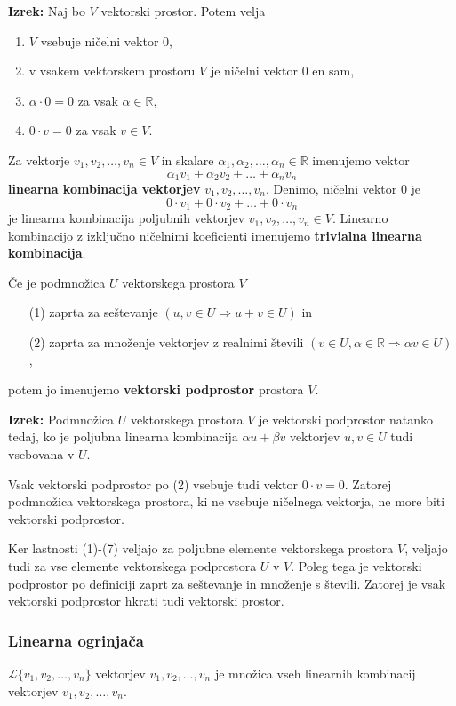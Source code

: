 \documentclass{article}
\begin{document}
\begin{multicols}{2}
	\textbf{Izrek:} Naj bo \( V \) vektorski prostor. Potem velja
	\begin{enumerate}
		\item \( V \) vsebuje ničelni vektor \( 0 \),
		\item v vsakem vektorskem prostoru \( V \) je ničelni vektor \( 0 \) en sam,
		\item \( \alpha \cdot 0 = 0 \) za vsak \( \alpha \in \mathbb{R} \),
		\item \( 0 \cdot v = 0 \) za vsak \( v \in V \).
	\end{enumerate}
	Za vektorje \( v_1, v_2, \ldots, v_n \in V \) in skalare \( \alpha_1, \alpha_2, \ldots, \alpha_n \in \mathbb{R} \) imenujemo vektor
	\[ \alpha_1v_1 + \alpha_2v_2 + \ldots + \alpha_nv_n \]
	\textbf{linearna kombinacija vektorjev} \( v_1, v_2, \ldots, v_n \).
	Denimo, ničelni vektor \( 0 \) je
	\[ 0 \cdot v_1 + 0 \cdot v_2 + \ldots + 0 \cdot v_n \]
	je linearna kombinacija poljubnih vektorjev \( v_1, v_2, \ldots, v_n \in V \). Linearno kombinacijo z izključno ničelnimi koeficienti imenujemo \textbf{trivialna linearna kombinacija}.

	Če je podmnožica \( U \) vektorskega prostora \( V \)
	\begin{itemize}
		\item[(1)] zaprta za seštevanje \( (u, v \in U \Rightarrow u + v \in U) \) in
		\item[(2)] zaprta za množenje vektorjev z realnimi števili \( (v \in U, \alpha \in \mathbb{R} \Rightarrow \alpha v \in U) \),
	\end{itemize}
	potem jo imenujemo \textbf{vektorski podprostor} prostora \( V \).

	\textbf{Izrek:} Podmnožica \( U \) vektorskega prostora \( V \) je vektorski podprostor natanko tedaj, ko je poljubna linearna kombinacija \( \alpha u + \beta v \) vektorjev \( u, v \in U \) tudi vsebovana v \( U \).

	Vsak vektorski podprostor po (2) vsebuje tudi vektor \( 0 \cdot v = 0 \). Zatorej podmnožica vektorskega prostora, ki ne vsebuje ničelnega vektorja, ne more biti vektorski podprostor.

	Ker lastnosti (1)-(7) veljajo za poljubne elemente vektorskega prostora \( V \), veljajo tudi za vse elemente vektorskega podprostora \( U \) v \( V \). Poleg tega je vektorski podprostor po definiciji zaprt za seštevanje in množenje s števili. Zatorej je vsak vektorski podprostor hkrati tudi vektorski prostor.

	\subsubsection{Linearna ogrinjača} \( \mathcal{L}\{v_1, v_2, \ldots, v_n\} \) vektorjev \( v_1, v_2, \ldots, v_n \) je množica vseh linearnih kombinacij vektorjev \( v_1, v_2, \ldots, v_n \).


\end{multicols}
\end{document}
